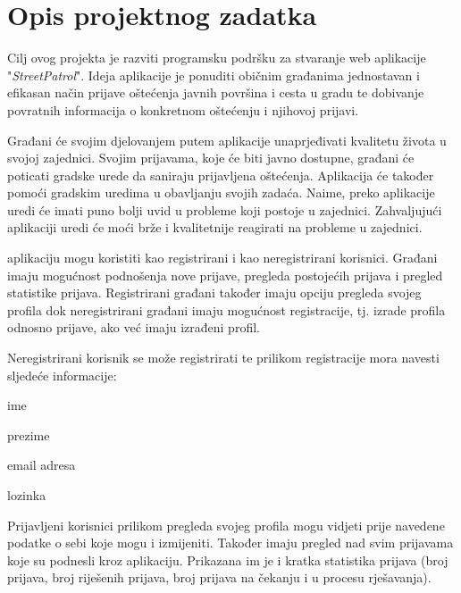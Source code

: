 \chapter{Opis projektnog zadatka}
		
		Cilj ovog projekta je razviti programsku podršku za stvaranje web aplikacije "\textit{StreetPatrol}". Ideja aplikacije je ponuditi običnim građanima jednostavan i efikasan način prijave oštećenja javnih površina i cesta u gradu te dobivanje povratnih informacija o konkretnom oštećenju i njihovoj prijavi. 
		
		Građani će svojim djelovanjem putem aplikacije unaprjeđivati kvalitetu života u svojoj zajednici. Svojim prijavama, koje će biti javno dostupne, građani će poticati gradske urede da saniraju prijavljena oštećenja. Aplikacija će također pomoći gradskim uredima u obavljanju svojih zadaća. Naime, preko aplikacije uredi će imati puno bolji uvid u probleme koji postoje u zajednici. Zahvaljujući aplikaciji uredi će moći brže i kvalitetnije reagirati na probleme u zajednici.
		
		 aplikaciju mogu koristiti kao registrirani i kao neregistrirani korisnici. Građani imaju mogućnost podnošenja nove prijave, pregleda postojećih prijava i pregled statistike prijava. Registrirani građani također imaju opciju pregleda svojeg profila dok neregistrirani građani imaju mogućnost registracije, tj. izrade profila odnosno prijave, ako već imaju izrađeni profil.
		
		Neregistrirani korisnik se može registrirati te prilikom registracije mora navesti sljedeće informacije:
		\begin{packed_item} 
			\item ime
			\item prezime
			\item email adresa
			\item lozinka
		\end{packed_item}  
		Prijavljeni korisnici prilikom pregleda svojeg profila mogu vidjeti prije navedene podatke o sebi koje mogu i izmijeniti. Također imaju pregled nad svim prijavama koje su podnesli kroz aplikaciju. Prikazana im je i kratka statistika prijava (broj prijava, broj riješenih prijava, broj prijava na čekanju i u procesu rješavanja). 
		
